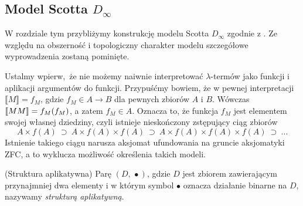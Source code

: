 \subsection{Model Scotta \(D_\infty\)}
W rozdziale tym przybliżymy konstrukcję modelu Scotta \(D_\infty\) zgodnie z \cite[Rozdział 16]{Hindley:2008:LCI:1388400}. Ze względu na obszerność i topologiczny charakter modelu szczegółowe wyprowadzenia zostaną pominięte.

Ustalmy wpierw, że nie możemy naiwnie interpretować \(\lambda\)-termów jako funkcji i aplikacji argumentów do funkcji. Przypuśćmy bowiem, że w pewnej interpretacji \(\llbracket M \rrbracket=f_M\), gdzie \(f_M \in A\to B\) dla pewnych zbiorów \(A\) i \(B\). Wówczas \(\llbracket M M\rrbracket=\nobreak f_M(f_M)\), a zatem \(f_M\in A\). Oznacza to, że funkcja \(f_M\) jest elementem swojej własnej dziedziny, czyli istnieje nieskończony zstępujący ciąg zbiorów \[A\times f(A)\ \supset\ A\times f(A)\times f(A)\ \supset\ A\times f(A)\times f(A)\times f(A)\ \supset\ \dots\] Istnienie takiego ciągu narusza aksjomat ufundowania na gruncie aksjomatyki ZFC, a to wyklucza możliwość określenia takich modeli.

\begin{definicja}(Struktura aplikatywna)
Parę \((D,\, \bullet)\), gdzie \(D\) jest zbiorem zawierającym przynajmniej dwa elementy i w którym symbol \(\bullet\) oznacza działanie binarne na \(D\), nazywamy \emph{strukturą aplikatywną}.
\end{definicja}


